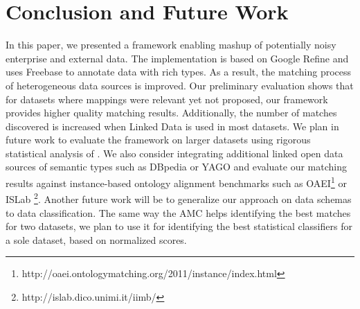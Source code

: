 \documentclass{sig-alternate}
\begin{document}

\section{Conclusion and Future Work}
In this paper, we presented a framework enabling mashup of potentially noisy enterprise and external data. The implementation is based on Google Refine and uses Freebase to annotate data with rich types. As a result, the matching process of heterogeneous data sources is improved. Our preliminary evaluation shows that for datasets where mappings were relevant yet not proposed, our framework provides higher quality matching results. Additionally, the number of matches discovered is increased when Linked Data is used in most datasets. We plan in future work to evaluate the framework on larger datasets using rigorous statistical analysis of \cite{Fawcett}. We also consider integrating additional linked open data sources of semantic types such as DBpedia \cite{Auer07dbpedia:a} or YAGO \cite{Suchanek:2007:YCS:1242572.1242667} and evaluate our matching results against instance-based ontology alignment benchmarks such as OAEI\footnote{http://oaei.ontologymatching.org/2011/instance/index.html} or ISLab \footnote{http://islab.dico.unimi.it/iimb/}. Another future work will be to generalize our approach on data schemas to data classification. The same way the AMC helps identifying the best matches for two datasets, we plan to use it for identifying the best statistical classifiers for a sole dataset, based on normalized scores.

\nocite{*}


\end{document}
